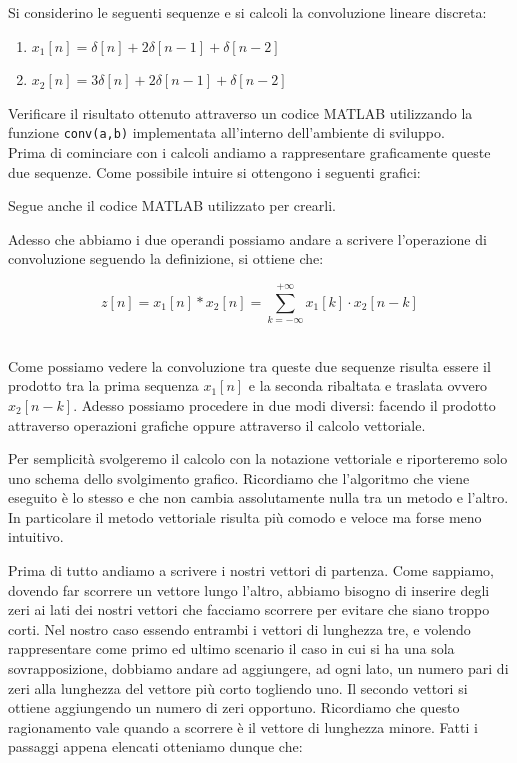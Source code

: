 \documentclass[../main.tex]{subfiles}
\begin{document}
Si considerino le seguenti sequenze e si calcoli la convoluzione lineare discreta:

\begin{enumerate}
	\item[\textbf{-}] $ x_1[n] = \delta[n] + 2\delta[n-1] + \delta[n-2] $
	\item[\textbf{-}] $ x_2[n] = 3\delta[n] + 2\delta[n-1] + \delta[n-2] $
\end{enumerate}

Verificare il risultato ottenuto attraverso un codice MATLAB utilizzando la
funzione \texttt{conv(a,b)} implementata all'interno dell'ambiente di sviluppo.\\


Prima di cominciare con i calcoli andiamo a rappresentare graficamente queste due sequenze. Come possibile intuire si ottengono i seguenti grafici:


Segue anche il codice MATLAB utilizzato per crearli.

Adesso che abbiamo i due operandi possiamo andare a scrivere l'operazione di convoluzione seguendo la definizione, si ottiene che:

\[ z[n] = x_1[n] \ast x_2[n] = \sum_{k = -\infty}^{+\infty} x_1[k] \cdot x_2[n - k] \]\

Come possiamo vedere la convoluzione tra queste due sequenze risulta essere il prodotto tra la prima sequenza $x_1[n]$ e la seconda ribaltata e traslata ovvero $x_2[n - k]$.
Adesso possiamo procedere in due modi diversi: facendo il prodotto attraverso operazioni grafiche oppure attraverso il calcolo vettoriale.

Per semplicità svolgeremo il calcolo con la notazione vettoriale e riporteremo solo uno schema dello svolgimento grafico. Ricordiamo che l'algoritmo che viene eseguito è lo stesso e che non cambia assolutamente nulla tra un metodo e l'altro. In particolare il metodo vettoriale risulta più comodo e veloce ma forse meno intuitivo.

Prima di tutto andiamo a scrivere i nostri vettori di partenza. Come sappiamo, dovendo far scorrere un vettore lungo l'altro, abbiamo bisogno di inserire degli zeri ai lati dei nostri vettori che facciamo scorrere per evitare che siano troppo corti. Nel nostro caso essendo entrambi i vettori di lunghezza tre, e volendo rappresentare come primo ed ultimo scenario il caso in cui si ha una sola sovrapposizione, dobbiamo andare ad aggiungere, ad ogni lato, un numero pari di zeri alla lunghezza del vettore più corto togliendo uno. Il secondo vettori si ottiene aggiungendo un numero di zeri opportuno. Ricordiamo che questo ragionamento vale quando a scorrere è il vettore di lunghezza minore.
Fatti i passaggi appena elencati otteniamo dunque che:
\end{document}
